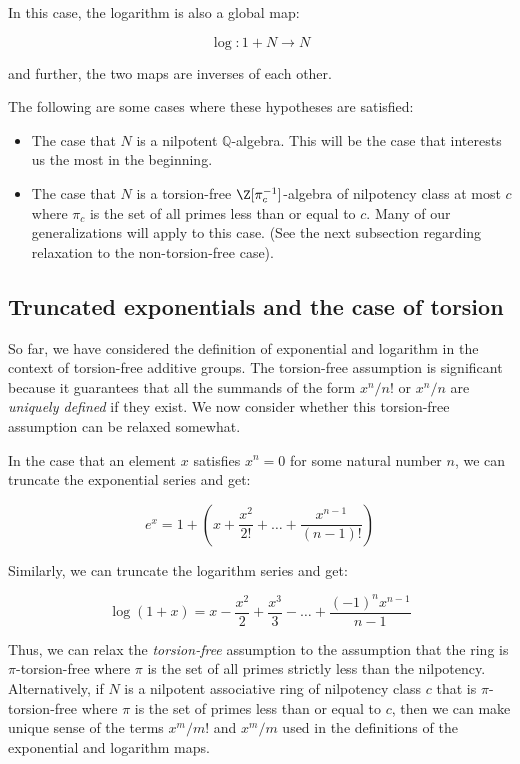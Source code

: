 \documentclass{ucetd}
\begin{document}
In this case, the logarithm is also a global map:

$$\log:1 + N \to N$$

and further, the two maps are inverses of each other.

The following are some cases where these hypotheses are satisfied:

\begin{itemize}
\item The case that $N$ is a nilpotent $\mathbb{Q}$-algebra. This will
  be the case that interests us the most in the beginning.
\item The case that $N$ is a torsion-free $\Z[\pi_c^{-1}]$-algebra of
  nilpotency class at most $c$ where $\pi_c$ is the set of all primes
  less than or equal to $c$. Many of our generalizations will apply to
  this case. (See the next subsection regarding relaxation to the
  non-torsion-free case).
\end{itemize}

\subsection{Truncated exponentials and the case of torsion}

So far, we have considered the definition of exponential and logarithm
in the context of torsion-free additive groups. The torsion-free
assumption is significant because it guarantees that all the summands
of the form $x^n/n!$ or $x^n/n$ are {\em uniquely defined} if they
exist. We now consider whether this torsion-free assumption can be
relaxed somewhat.

In the case that an element $x$ satisfies $x^n = 0$ for some natural
number $n$, we can truncate the exponential series and get:

$$e^x = 1 + \left(x + \frac{x^2}{2!} + \dots + \frac{x^{n-1}}{(n - 1)!}\right)$$

Similarly, we can truncate the logarithm series and get:

$$\log(1 + x) = x - \frac{x^2}{2} + \frac{x^3}{3} - \dots + \frac{(-1)^nx^{n-1}}{n - 1}$$

Thus, we can relax the {\em torsion-free} assumption to the assumption
that the ring is $\pi$-torsion-free where $\pi$ is the set of all
primes strictly less than the nilpotency. Alternatively, if $N$ is a
nilpotent associative ring of nilpotency class $c$ that is
$\pi$-torsion-free where $\pi$ is the set of primes less than or equal
to $c$, then we can make unique sense of the terms $x^m/m!$ and
$x^m/m$ used in the definitions of the exponential and logarithm
maps. 
\end{document}

